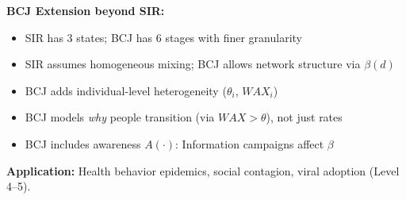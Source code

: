 \begin{tcolorbox}[colback=green!5!white, colframe=green!75!black,
    title=Theorem BCJ-T19: SIR Epidemiological Model as Special Case]
\textbf{BCJ Extension beyond SIR:}
\begin{itemize}[nosep]
\item SIR has 3 states; BCJ has 6 stages with finer granularity
\item SIR assumes homogeneous mixing; BCJ allows network structure via $\beta(d)$
\item BCJ adds individual-level heterogeneity ($\theta_i$, $WAX_i$)
\item BCJ models \textit{why} people transition (via $WAX > \theta$), not just rates
\item BCJ includes awareness $A(\cdot)$: Information campaigns affect $\beta$
\end{itemize}

\textbf{Application:} Health behavior epidemics, social contagion, viral adoption (Level 4--5).
\end{tcolorbox}

